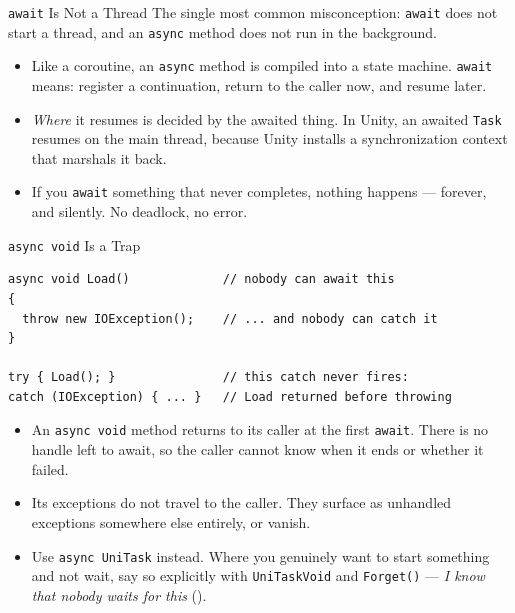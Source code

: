 \begin{frame}{\texttt{await} Is Not a Thread}
  The single most common misconception: \texttt{await} does not start a
  thread, and an \texttt{async} method does not run in the background.
  \vspace{2ex}

  \begin{itemize}
    \item Like a coroutine, an \texttt{async} method is compiled into a state
      machine. \texttt{await} means: register a continuation, return to the
      caller now, and resume later.
    \item \emph{Where} it resumes is decided by the awaited thing. In Unity,
      an awaited \texttt{Task} resumes on the main thread, because Unity
      installs a synchronization context that marshals it back.
    \item If you \texttt{await} something that never completes, nothing
      happens --- forever, and silently. No deadlock, no error.
  \end{itemize}
  \vspace{2ex}

\end{frame}


\begin{frame}[fragile]{\texttt{async void} Is a Trap}
  \begin{lstlisting}[basicstyle=\scriptsize\ttfamily]
async void Load()             // nobody can await this
{
  throw new IOException();    // ... and nobody can catch it
}

try { Load(); }               // this catch never fires:
catch (IOException) { ... }   // Load returned before throwing
  \end{lstlisting}
  \vspace{1ex}

  \begin{itemize}
    \item An \texttt{async void} method returns to its caller at the first
      \texttt{await}. There is no handle left to await, so the caller cannot
      know when it ends or whether it failed.
    \item Its exceptions do not travel to the caller. They surface as
      unhandled exceptions somewhere else entirely, or vanish.
    \item Use \texttt{async UniTask} instead. Where you genuinely want to
      start something and not wait, say so explicitly with
      \texttt{UniTaskVoid} and \texttt{Forget()} --- \emph{I know that nobody
      waits for this} ().
  \end{itemize}
\end{frame}

